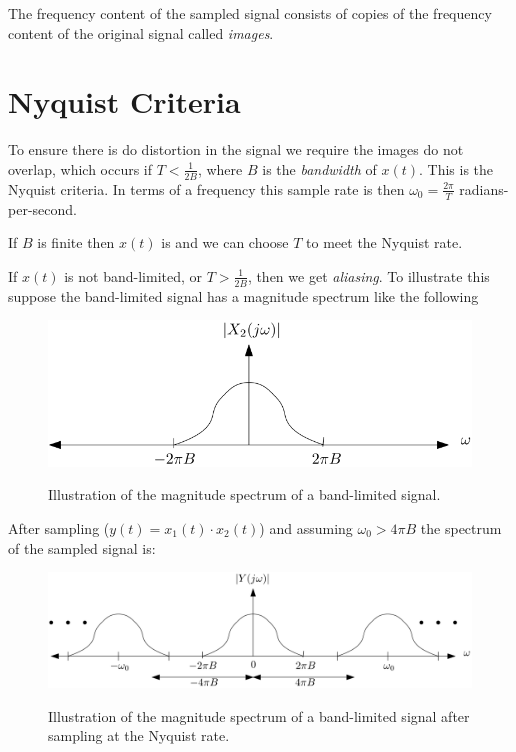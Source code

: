 \documentclass{article}
\begin{document}
The frequency content of the sampled signal consists of copies of the frequency content of the original signal called \textit{images}.

\section{Nyquist Criteria}

To ensure there is do distortion in the signal we require the images do not overlap, which occurs if $T < \frac{1}{2B}$, where $B$ is the \textit{bandwidth} of $x(t)$. This is the Nyquist criteria. In terms of a frequency this sample rate is then $\omega_0 = \tfrac{2\pi}{T}$ radians-per-second.

If $B$ is finite then $x(t)$ is  and we can choose $T$ to meet the Nyquist rate.

If $x(t)$ is not band-limited, or $T > \frac{1}{2B}$, then we get \textit{aliasing}. To illustrate this suppose the band-limited signal has a magnitude spectrum like the following

\begin{figure}
  \centering
  \includegraphics[width=0.8\linewidth, alt="the magnitude spectrum of a band-limited signal"]{bandlimited.svg}
  \caption{Illustration of the magnitude spectrum of a band-limited signal.}
\end{figure}

After sampling ($y(t) = x_1(t)\cdot x_2(t)$) and assuming $\omega_0 > 4\pi B$ the spectrum of the sampled signal is:

\begin{figure}
  \centering
  \includegraphics[width=0.8\linewidth, alt="the magnitude spectrum of a band-limited signal after sampling at the Nyquist rate"]{bandlimitedsampled1.svg}
  \caption{Illustration of the magnitude spectrum of a band-limited signal after sampling at the Nyquist rate.}
\end{figure}
\end{document}
